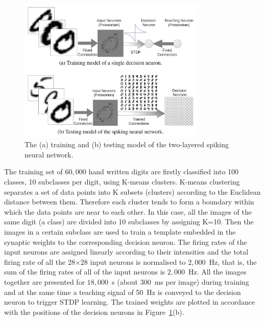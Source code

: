 \begin{figure}[thb!]
	\centering
	\includegraphics[width=0.8\textwidth]{pics_bench/fig6.jpg}
	\caption{The (a) training and (b) testing model of the two-layered spiking neural network.}
	\label{fig:model}
\end{figure} 

The training set of $60,000$ hand written digits are firstly classified into 100 classes, 10 subclasses per digit, using K-means clusters.
K-means clustering separates a set of data points into K subsets (clusters) according to the Euclidean distance between them.
Therefore each cluster tends to form a boundary within which the data points are near to each other.
In this case, all the images of the same digit (a class) are divided into 10 subclasses by assigning K=10.
Then the images in a certain subclass are used to train a template embedded in the synaptic weights to the corresponding decision neuron.
The firing rates of the input neurons are assigned linearly according to their intensities and the total firing rate of all the 28$\times$28 input neurons is normalised to $2,000$~Hz, that is, the sum of the firing rates of all of the input neurons is $2,000$~Hz.
All the images together are presented for $18,000$~s (about 300~ms per image) during training and at the same time a teaching signal of 50~Hz is conveyed to the decision neuron to trigger STDP learning.
The trained weights are plotted in accordance with the positions of the decision neurons in Figure~\ref{fig:model}(b).





